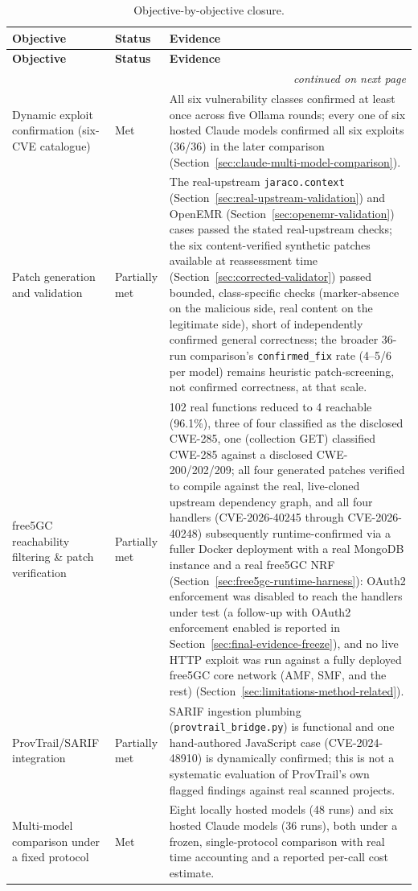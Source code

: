 \documentclass[12pt,a4paper]{report}
\begin{document}
\begin{longtable}{@{}p{3.3cm}p{2.1cm}p{7.1cm}@{}}
\caption{Objective-by-objective closure.}
\label{tab:objective-closure} \\
\toprule
\textbf{Objective} & \textbf{Status} & \textbf{Evidence} \\
\midrule
\endfirsthead
\toprule
\textbf{Objective} & \textbf{Status} & \textbf{Evidence} \\
\midrule
\endhead
\midrule
\multicolumn{3}{r}{\footnotesize\emph{continued on next page}} \\
\endfoot
\bottomrule
\endlastfoot
Dynamic exploit confirmation (six-CVE catalogue) & Met & All six vulnerability classes confirmed at least once across five Ollama rounds; every one of six hosted Claude models confirmed all six exploits (36/36) in the later comparison (Section~\ref{sec:claude-multi-model-comparison}). \\
Patch generation and validation & Partially met & The real-upstream \texttt{jaraco.context} (Section~\ref{sec:real-upstream-validation}) and OpenEMR (Section~\ref{sec:openemr-validation}) cases passed the stated real-upstream checks; the six content-verified synthetic patches available at reassessment time (Section~\ref{sec:corrected-validator}) passed bounded, class-specific checks (marker-absence on the malicious side, real content on the legitimate side), short of independently confirmed general correctness; the broader 36-run comparison's \texttt{confirmed\_fix} rate (4--5/6 per model) remains heuristic patch-screening, not confirmed correctness, at that scale. \\
free5GC reachability filtering \& patch verification & Partially met & 102 real functions reduced to 4 reachable (96.1\%), three of four classified as the disclosed CWE-285, one (collection GET) classified CWE-285 against a disclosed CWE-200/202/209; all four generated patches verified to compile against the real, live-cloned upstream dependency graph, and all four handlers (CVE-2026-40245 through CVE-2026-40248) subsequently runtime-confirmed via a fuller Docker deployment with a real MongoDB instance and a real free5GC NRF (Section~\ref{sec:free5gc-runtime-harness}): OAuth2 enforcement was disabled to reach the handlers under test (a follow-up with OAuth2 enforcement enabled is reported in Section~\ref{sec:final-evidence-freeze}), and no live HTTP exploit was run against a fully deployed free5GC core network (AMF, SMF, and the rest) (Section~\ref{sec:limitations-method-related}). \\
ProvTrail/SARIF integration & Partially met & SARIF ingestion plumbing (\texttt{provtrail\_bridge.py}) is functional and one hand-authored JavaScript case (CVE-2024-48910) is dynamically confirmed; this is not a systematic evaluation of ProvTrail's own flagged findings against real scanned projects. \\
Multi-model comparison under a fixed protocol & Met & Eight locally hosted models (48 runs) and six hosted Claude models (36 runs), both under a frozen, single-protocol comparison with real time accounting and a reported per-call cost estimate. \\
\end{longtable}
\end{document}
